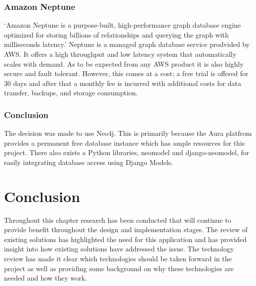 \subsubsection*{Amazon Neptune}
`Amazon Neptune is a purpose-built, high-performance graph database engine optimized for storing billions of 
relationships and querying the graph with milliseconds latency.'\cite{WhatGraphDatabase} Neptune is a managed graph 
database service prodvided by AWS. It offers a high throughput and low latency system that automatically scales with 
demand. As to be expected from any AWS product it is also highly secure and fault tolerant. However, this comes at a 
cost; a free trial is offered for 30 days and after that a monthly fee is incurred with additional costs for data 
transfer, backups, and storage consumption.
\subsubsection*{Conclusion}
The decision was made to use Neo4j. This is primarily because the Aura platfrom provides a permanent free database 
instance which has ample resources for this project. There also exists a Python libraries, neomodel and django-neomodel,
 for easily integrating database access using Django Models. 
\section{Conclusion}
Throughout this chapter research has been conducted that will continue to provide benefit throughout the design and 
implementation stages. The review of existing solutions has highlighted the need for this application and has provided 
insight into how existing solutions have addressed the issue. The technology review has made it clear which technologies
 should be taken forward in the project as well as providing some background on why these technologies are needed and 
how they work.